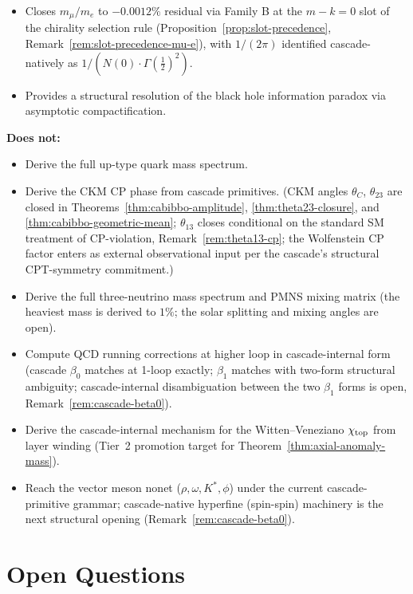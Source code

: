 \documentclass[12pt,a4paper]{article}
\begin{document}
\begin{itemize}
\item Closes $m_\mu/m_e$ to $-0.0012\%$ residual via Family B at the $m{-}k=0$ slot of the chirality selection rule (Proposition~\ref{prop:slot-precedence}, Remark~\ref{rem:slot-precedence-mu-e}), with $1/(2\pi)$ identified cascade-natively as $1/(N(0)\cdot\Gamma(\tfrac{1}{2})^2)$.
\item Provides a structural resolution of the black hole information paradox via asymptotic compactification.
\end{itemize}

\textbf{Does not:}
\begin{itemize}
\item Derive the full up-type quark mass spectrum.
\item Derive the CKM CP phase from cascade primitives. (CKM angles $\theta_C$, $\theta_{23}$ are closed in Theorems~\ref{thm:cabibbo-amplitude}, \ref{thm:theta23-closure}, and \ref{thm:cabibbo-geometric-mean}; $\theta_{13}$ closes conditional on the standard SM treatment of CP-violation, Remark~\ref{rem:theta13-cp}; the Wolfenstein CP factor enters as external observational input per the cascade's structural CPT-symmetry commitment.)
\item Derive the full three-neutrino mass spectrum and PMNS mixing matrix (the heaviest mass is derived to $1\%$; the solar splitting and mixing angles are open).
\item Compute QCD running corrections at higher loop in cascade-internal form (cascade $\beta_0$ matches at 1-loop exactly; $\beta_1$ matches with two-form structural ambiguity; cascade-internal disambiguation between the two $\beta_1$ forms is open, Remark~\ref{rem:cascade-beta0}).
\item Derive the cascade-internal mechanism for the Witten--Veneziano $\chi_{\rm top}$ from layer winding (Tier~2 promotion target for Theorem~\ref{thm:axial-anomaly-mass}).
\item Reach the vector meson nonet ($\rho, \omega, K^*, \phi$) under the current cascade-primitive grammar; cascade-native hyperfine (spin-spin) machinery is the next structural opening (Remark~\ref{rem:cascade-beta0}).
\end{itemize}

\section{Open Questions}\label{sec:open-questions-part4b}
\end{document}
